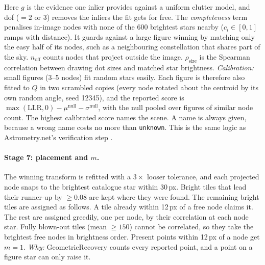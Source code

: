 \documentclass[a4paper,11pt]{article}
\begin{document}
Here $g$ is the evidence one inlier provides against a uniform clutter model, and dof ($=2$ or 3) removes the inliers the fit
gets for free. The \emph{completeness} term penalises in-image nodes with none of the 600 brightest stars nearby
($c_i\in[0,1]$ ramps with distance). It guards against a large figure winning by matching only the easy half of its
nodes, such as a neighbouring constellation that shares part of the sky. $n_{\text{off}}$ counts nodes that project outside the image.
$\rho_{\text{size}}$ is the Spearman correlation between drawing dot sizes and matched star brightness. \emph{Calibration:}
small figures (3--5 nodes) fit random stars easily. Each figure is therefore also fitted to $Q$ in two scrambled copies
(every node rotated about the centroid by its own random angle, seed 12345), and the reported score is
$\max(\mathrm{LLR},0) - \mu^{\mathrm{null}} - \sigma^{\mathrm{null}}$, with the null pooled over figures of similar node count.
The highest calibrated score names the scene. A name is always given, because a wrong name costs no more than
\texttt{unknown}. This is the same logic as Astrometry.net's verification step \parencite{lang2010astrometry}.

\paragraph{Stage 7: placement and $m$.} The winning transform is refitted with a $3\times$ looser tolerance, and each
projected node snaps to the brightest catalogue star within 30\,px. Bright tiles that lead their runner-up by $\ge0.08$
are kept where they were found. The remaining bright tiles are assigned as follows. A tile already within 12\,px of a
free node claims it. The rest are assigned greedily, one per node, by their correlation at each node star. Fully
blown-out tiles (mean $\ge150$) cannot be correlated, so they take the brightest free nodes in brightness order. Present points
within 12\,px of a node get $m=1$. \emph{Why:} GeometricRecovery counts every reported point, and a point on a figure
star can only raise it.
\end{document}
